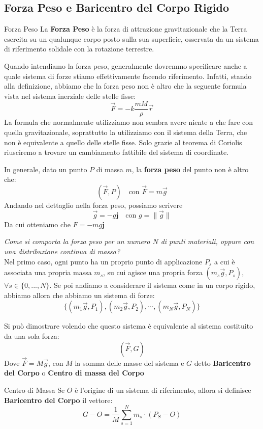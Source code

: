 \documentclass[11pt,a4paper,twoside]{article}
\theoremstyle{definition}
\begin{document}
\subsection{Forza Peso e Baricentro del Corpo Rigido}

\begin{defn}{Forza Peso}{}
	La \textbf{Forza Peso} è la forza di attrazione gravitazionale che la Terra esercita su un qualunque corpo posto sulla sua superficie, osservata da un sistema di riferimento solidale con la rotazione terrestre.
\end{defn}

Quando intendiamo la forza peso, generalmente dovremmo specificare anche a quale sistema di forze stiamo effettivamente facendo riferimento. Infatti, stando alla definizione, abbiamo che la forza peso non è altro che la seguente formula vista nel sistema inerziale delle stelle fisse:
\[ \vec F = -k \frac{mM}\rho \vec r \]
La formula che normalmente utilizziamo non sembra avere niente a che fare con quella gravitazionale, soprattutto la utilizziamo con il sistema della Terra, che non è equivalente a quello delle stelle fisse. Solo grazie al teorema di Coriolis riusciremo a trovare un cambiamento fattibile del sistema di coordinate.

In generale, dato un punto $P$ di massa $m$, la \textbf{forza peso} del punto non è altro che:
\[ (\vec F, P)\quad \text{con }\vec F = m\vec g \]
Andando nel dettaglio nella forza peso, possiamo scrivere
\[\vec g = -g \mathbf{j}\quad \text{con }g = \|\vec g\|\]
Da cui otteniamo che $F = -mg\mathbf j$

\textit{Come si comporta la forza peso per un numero $N$ di punti materiali, oppure con una distribuzione continua di massa?}\\
Nel primo caso, ogni punto ha un proprio punto di applicazione $P_s$ a cui è associata una propria massa $m_s$, su cui agisce una propria forza $(m_s\vec g, P_s)$, $\forall s \in \{0,...,N\}$. Se poi andiamo a considerare il sistema come in un corpo rigido, abbiamo allora che abbiamo un sistema di forze:
\[ \{(m_1\vec g, P_1), (m_2 \vec g, P_2),\cdots, (m_N\vec g, P_N)\} \]

Si può dimostrare volendo che questo sistema è equivalente al sistema costituito da una sola forza:
\[ (\vec F, G) \]
Dove $\vec F = M \vec g$, con $M$ la somma delle masse del sistema e $G$ detto \textbf{Baricentro del Corpo} o \textbf{Centro di massa del Corpo}

\begin{defn}{Centro di Massa}{}
	Se $O$ è l'origine di un sistema di riferimento, allora si definisce \textbf{Baricentro del Corpo} il vettore:
	\[ G-O = \frac 1M \sum_{s = 1}^N m_s \cdot (P_S-O) \]
\end{defn}
\end{document}
